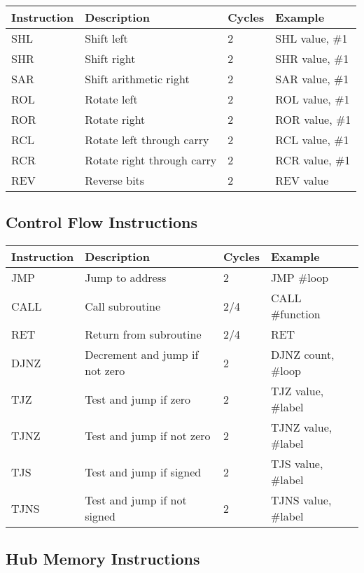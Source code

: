 \documentclass[11pt]{book}
\begin{document}
\begin{longtable}[]{@{}llll@{}}
\toprule
Instruction & Description & Cycles & Example \\
\midrule
\endhead
SHL & Shift left & 2 & SHL value, \#1 \\
SHR & Shift right & 2 & SHR value, \#1 \\
SAR & Shift arithmetic right & 2 & SAR value, \#1 \\
ROL & Rotate left & 2 & ROL value, \#1 \\
ROR & Rotate right & 2 & ROR value, \#1 \\
RCL & Rotate left through carry & 2 & RCL value, \#1 \\
RCR & Rotate right through carry & 2 & RCR value, \#1 \\
REV & Reverse bits & 2 & REV value \\
\bottomrule
\end{longtable}

\hypertarget{control-flow-instructions}{%
\subsection{Control Flow Instructions}\label{control-flow-instructions}}

\begin{longtable}[]{@{}llll@{}}
\toprule
Instruction & Description & Cycles & Example \\
\midrule
\endhead
JMP & Jump to address & 2 & JMP \#loop \\
CALL & Call subroutine & 2/4 & CALL \#function \\
RET & Return from subroutine & 2/4 & RET \\
DJNZ & Decrement and jump if not zero & 2 & DJNZ count, \#loop \\
TJZ & Test and jump if zero & 2 & TJZ value, \#label \\
TJNZ & Test and jump if not zero & 2 & TJNZ value, \#label \\
TJS & Test and jump if signed & 2 & TJS value, \#label \\
TJNS & Test and jump if not signed & 2 & TJNS value, \#label \\
\bottomrule
\end{longtable}

\hypertarget{hub-memory-instructions}{%
\subsection{Hub Memory Instructions}\label{hub-memory-instructions}}
\end{document}
